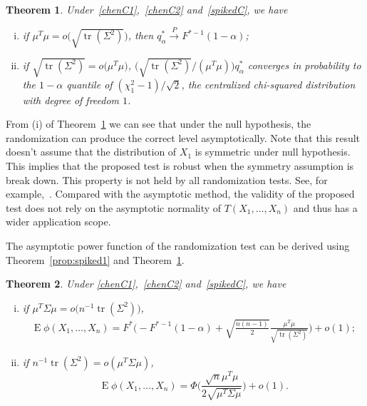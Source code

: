 \documentclass[3p]{elsarticle}
\DeclareMathOperator{\mytr}{tr}
\DeclareMathOperator{\myE}{E}
\theoremstyle{plain}
\newtheorem{theorem}{\quad\quad Theorem}
\theoremstyle{definition}
\theoremstyle{remark}
\begin{document}
\begin{theorem}\label{ourTheorem}
    Under~\eqref{chenC1},~\eqref{chenC2} and~\eqref{spikedC},
    we have
    \begin{enumerate}[(i)]
        \item
            if $\mu^T \mu=o\big(\sqrt{\mytr(\Sigma^2)}\big)$, then
            $
            q_{\alpha}^*\xrightarrow{P}F^{*-1}(1-\alpha)
            $;
\item
    if $\sqrt{\mytr(\Sigma^2)}=o\big(\mu^T \mu\big)$, $\big(\sqrt{\mytr(\Sigma^2)}/(\mu^T \mu)\big)q_{\alpha}^*$ converges in probability to the $1-\alpha$ quantile of  $(\chi^2_1-1)/\sqrt{2}$, the centralized chi-squared distribution with degree of freedom $1$.
    \end{enumerate}
\end{theorem}
From (i) of Theorem~\ref{ourTheorem} we can see that under the null hypothesis, the randomization can produce the correct level asymptotically.
Note that this result doesn't assume that the distribution of $X_1$ is symmetric under null hypothesis.
This implies that the proposed test is robust when the symmetry assumption is break down.
This property is not held by all randomization tests.
See, for example,~\cite{Romano1990On}.
Compared with the asymptotic method, the validity of the proposed test does not rely on the asymptotic normality of $T(X_1,\ldots,X_n)$ and thus has a wider application scope.



The asymptotic power function of the randomization test can be derived using Theorem~\ref{prop:spiked1} and Theorem~\ref{ourTheorem}.

\begin{theorem}\label{theoremPower}
    Under \eqref{chenC1},~\eqref{chenC2} and~\eqref{spikedC}, we have
    \begin{enumerate}[(i)]
        \item
            if $\mu^T \Sigma \mu= o\big(n^{-1}\mytr(\Sigma^2)\big)$,
    \begin{equation*}\label{oPower}
        \begin{aligned}
            \myE \phi(X_1,\ldots,X_n)=
            F^*\bigg(-F^{*-1}(1-\alpha)+\sqrt{\frac{n(n-1)}{2}}\frac{\mu^T\mu}{\sqrt{\mytr (\Sigma^2)}}\bigg)+o(1);
        \end{aligned}
    \end{equation*}
\item
    if $n^{-1}\mytr(\Sigma^2)=o(\mu^T \Sigma \mu )$,
    \begin{equation*}\label{oPower2}
            \myE \phi(X_1,\ldots,X_n)=
            \Phi\Big(\frac{\sqrt{n}\mu^T\mu}{2\sqrt{\mu^T \Sigma \mu}}\Big)+o(1).
    \end{equation*}

    \end{enumerate}
\end{theorem}
\end{document}
